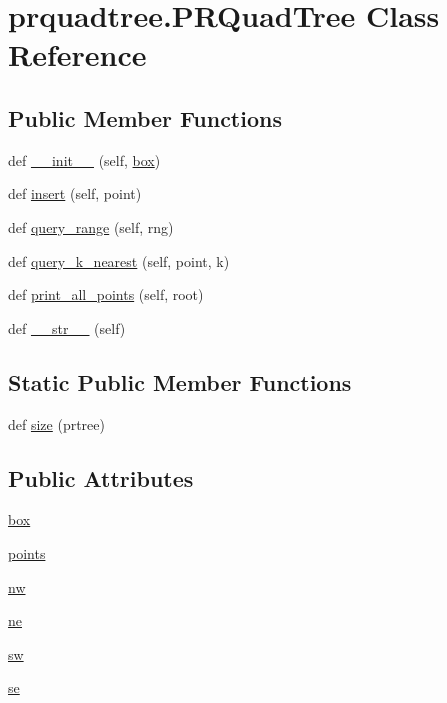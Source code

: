 \section{prquadtree.\+P\+R\+Quad\+Tree Class Reference}
\label{classprquadtree_1_1PRQuadTree}
\subsection*{Public Member Functions}
\begin{DoxyCompactItemize}
\item 
def \hyperlink{classprquadtree_1_1PRQuadTree_a56de30271f808d21281b790a19448aab}{\+\_\+\+\_\+init\+\_\+\+\_\+} (self, \hyperlink{classprquadtree_1_1PRQuadTree_a2f1d8e21568aa0467a7dabedb50e3593}{box})
\item 
def \hyperlink{classprquadtree_1_1PRQuadTree_ab9ca8c1d94c56c72f47dabd2f90b7754}{insert} (self, point)
\item 
def \hyperlink{classprquadtree_1_1PRQuadTree_ab145cd20b246f04ddcd53ae9618b5479}{query\+\_\+range} (self, rng)
\item 
def \hyperlink{classprquadtree_1_1PRQuadTree_a578891ac618a6770184fc1c02f426b45}{query\+\_\+k\+\_\+nearest} (self, point, k)
\item 
def \hyperlink{classprquadtree_1_1PRQuadTree_a0d43d9d2ebe765b6690067c1d8bc5a8a}{print\+\_\+all\+\_\+points} (self, root)
\item 
def \hyperlink{classprquadtree_1_1PRQuadTree_a2f9dd431836575327c97cd3fb5426adb}{\+\_\+\+\_\+str\+\_\+\+\_\+} (self)
\end{DoxyCompactItemize}
\subsection*{Static Public Member Functions}
\begin{DoxyCompactItemize}
\item 
def \hyperlink{classprquadtree_1_1PRQuadTree_a5dd006b80f1697585a10722fba06e9ba}{size} (prtree)
\end{DoxyCompactItemize}
\subsection*{Public Attributes}
\begin{DoxyCompactItemize}
\item 
\hyperlink{classprquadtree_1_1PRQuadTree_a2f1d8e21568aa0467a7dabedb50e3593}{box}
\item 
\hyperlink{classprquadtree_1_1PRQuadTree_a6534693edb5dd5450859c5b4b0773936}{points}
\item 
\hyperlink{classprquadtree_1_1PRQuadTree_a6d0f1330cc70f704f8153fd1f386b9c3}{nw}
\item 
\hyperlink{classprquadtree_1_1PRQuadTree_acf96c88788ee32d03032c490b9a90f68}{ne}
\item 
\hyperlink{classprquadtree_1_1PRQuadTree_aee59816ff69872d39d406a103dd2e2f8}{sw}
\item 
\hyperlink{classprquadtree_1_1PRQuadTree_acf5a1f668e9962b03120856564e0a3b0}{se}
\end{DoxyCompactItemize}
